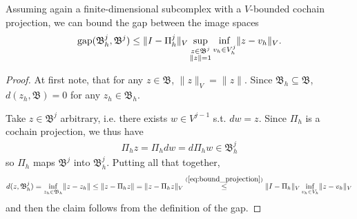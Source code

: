 \documentclass[../master_thesis.tex]{subfiles}
\begin{document}
\begin{proposition}\label{prop:gap_image_spaces}
    Assuming again a finite-dimensional subcomplex with a $V$-bounded cochain projection,
    we can bound the gap between the image spaces
    \begin{align*}
        \operatorname{gap} (\mathfrak{B}^j_h, \mathfrak{B}^j) 
        \leq \lVert I - \Pi_h^j \rVert _V  \sup_{\substack{z \in \mathfrak{B}^j \\ \lVert z \rVert = 1} } 
        \inf_{v_h \in V^j_h} \lVert z - v_h \rVert _V.
    \end{align*}
\end{proposition}
\begin{proof}
    At first note, that for any $z \in \mathfrak{B}$, $\lVert z \rVert _V = \lVert z \rVert$.
    Since $\mathfrak{B}_h \subseteq \mathfrak{B}$, $d(z_h, \mathfrak{B}) = 0$ for any 
    $z_h \in \mathfrak{B}_h$. 
    
    Take $z \in \mathfrak{B}^j$ arbitrary, i.e. there exists $w \in V^{j-1}$ s.t. 
    $dw = z$.
    Since $\Pi_h$  is a cochain projection, we thus have 
    \begin{align*}
        \Pi_h z = \Pi_h dw = d \Pi_h w \in \mathfrak{B}_h^j
    \end{align*}
    so $\Pi_h$ maps $\mathfrak{B}^j$ into $\mathfrak{B}^j_h$. Putting all that together,
    \begin{align*}
        d(z,\mathfrak{B}^j_h) = \inf_{z_h \in \mathfrak{B}_h} \lVert z - z_h \rVert 
        \leq \lVert z - \Pi_h z \rVert 
        = \lVert z - \Pi_h z \rVert _V
        \stackrel{(\ref{eq:bound_projection})}{\leq} \lVert I - \Pi_h \rVert _V \inf_{v_h \in V_h} \lVert z - v_h \rVert _V
    \end{align*}
    and then the claim follows from the definition of the gap.
\end{proof}
\end{document}
